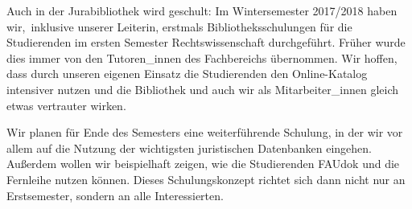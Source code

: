 \documentclass[a4paper,
fontsize=11pt,
oneside,
numbers=noperiodatend,
parskip=half-,
bibliography=totoc,
final
]{scrartcl}
\begin{document}
Auch in der Jurabibliothek wird geschult: Im Wintersemester 2017/2018
haben wir,~inklusive unserer Leiterin, erstmals Bibliotheksschulungen
für die Studierenden im ersten Semester Rechtswissenschaft durchgeführt.
Früher wurde dies immer von den Tutoren\_innen des Fachbereichs
übernommen. Wir hoffen, dass durch unseren eigenen Einsatz die
Studierenden den Online-Katalog intensiver nutzen und die Bibliothek und
auch wir als Mitarbeiter\_innen gleich etwas vertrauter wirken.

Wir planen für Ende des Semesters eine weiterführende Schulung, in der
wir vor allem auf die Nutzung der wichtigsten juristischen Datenbanken
eingehen. Außerdem wollen wir beispielhaft zeigen, wie die Studierenden
FAUdok und die Fernleihe nutzen können. Dieses Schulungskonzept richtet
sich dann nicht nur an Erstsemester, sondern an alle Interessierten.

\end{document}
